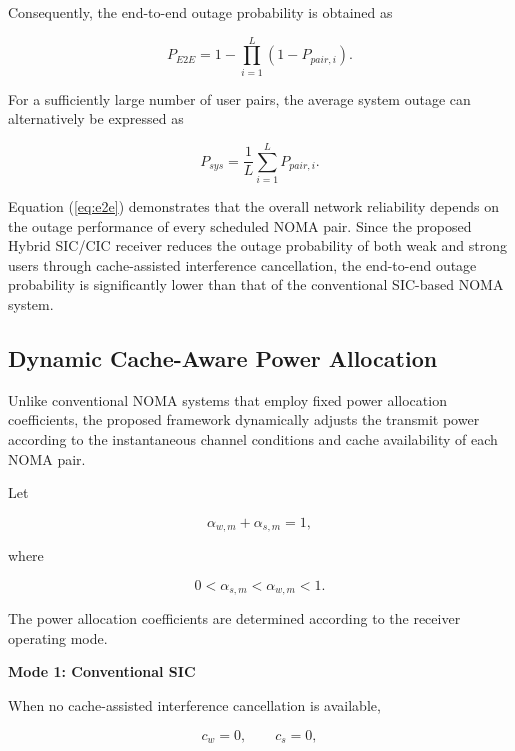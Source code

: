 \documentclass[conference]{IEEEtran}
\begin{document}
Consequently, the end-to-end outage probability is obtained as

\begin{equation}
P_{E2E}
=
1-
\prod_{i=1}^{L}
\left(1-P_{pair,i}\right).
\label{eq:e2e}
\end{equation}

For a sufficiently large number of user pairs, the average system outage can alternatively be expressed as

\begin{equation}
P_{sys}
=
\frac{1}{L}
\sum_{i=1}^{L}
P_{pair,i}.
\label{eq:avg_system}
\end{equation}

Equation (\ref{eq:e2e}) demonstrates that the overall network reliability depends on the outage performance of every scheduled NOMA pair. Since the proposed Hybrid SIC/CIC receiver reduces the outage probability of both weak and strong users through cache-assisted interference cancellation, the end-to-end outage probability is significantly lower than that of the conventional SIC-based NOMA system.

\subsection{Dynamic Cache-Aware Power Allocation}

Unlike conventional NOMA systems that employ fixed power allocation coefficients, the proposed framework dynamically adjusts the transmit power according to the instantaneous channel conditions and cache availability of each NOMA pair.

Let

\begin{equation}
\alpha_{w,m}+\alpha_{s,m}=1,
\label{eq:power_sum}
\end{equation}

where

\begin{equation}
0<\alpha_{s,m}<\alpha_{w,m}<1.
\end{equation}

The power allocation coefficients are determined according to the receiver operating mode.

\textbf{Mode 1: Conventional SIC}

When no cache-assisted interference cancellation is available,

\[
c_w=0,\qquad c_s=0,
\]
\end{document}
